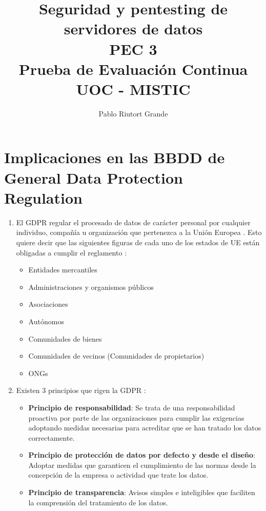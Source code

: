 \documentclass[a4paper,oneside]{article}
\author{Pablo Riutort Grande}
\title{
	Seguridad y pentesting de servidores de datos\\
	\vspace{0.5cm}
	PEC 3\\
	\vspace{1cm}
	\textbf{Prueba de Evaluación Continua}
	\vspace{1cm}\\UOC - MISTIC
}
\begin{document}
\maketitle
\pagebreak
\tableofcontents
\listoffigures

\pagebreak

\section{Implicaciones en las BBDD de General Data Protection Regulation}
\begin{enumerate}[label=\textbf{\alph*)}]
\item 
El GDPR regular el procesado de datos de carácter personal por cualquier individuo, compañía u organización que pertenezca a la Unión Europea \cite{gdpr1}. Esto quiere decir que las siguientes figuras de cada uno de los estados de UE están obligadas a cumplir el reglamento \cite{gdpr2}:
\begin{itemize}
\item Entidades mercantiles
\item Administraciones y organismos públicos
\item Asociaciones
\item Autónomos
\item Comunidades de bienes
\item Comunidades de vecinos (Comunidades de propietarios)
\item ONGs
\end{itemize}

\item 
Existen 3 principios que rigen la GDPR \cite{rgpd}:
\begin{itemize}
\item \textbf{Principio de responsabilidad}: Se trata de una responsabilidad proactiva por parte de las organizaciones para cumplir las exigencias adoptando medidas necesarias para acreditar que se han tratado los datos correctamente.
\item \textbf{Principio de protección de datos por defecto y desde el diseño}: Adoptar medidas que garanticen el cumplimiento de las normas desde la concepción de la empresa o actividad que trate los datos.
\item \textbf{Principio de transparencia}: Avisos simples e inteligibles que faciliten la comprensión del tratamiento de los datos.
\end{itemize}


\end{enumerate}
\end{document}
